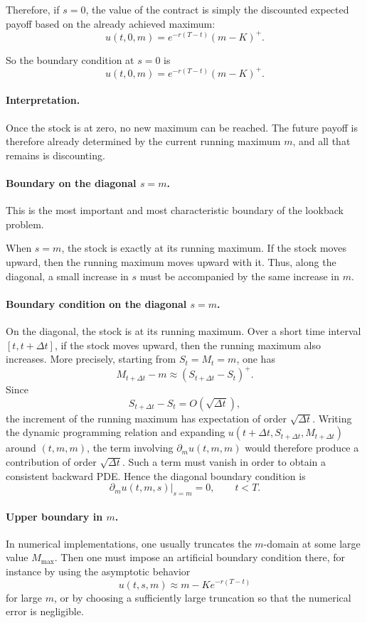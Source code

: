 \documentclass[11pt]{article}
\theoremstyle{plain}
\theoremstyle{definition}
\theoremstyle{remark}
\begin{document}
Therefore, if \(s=0\), the value of the contract is simply the discounted
expected payoff based on the already achieved maximum:
\[
u(t,0,m)=e^{-r(T-t)}(m-K)^+.
\]

So the boundary condition at \(s=0\) is
\[
\boxed{
u(t,0,m)=e^{-r(T-t)}(m-K)^+.
}
\]

\paragraph{Interpretation.}
Once the stock is at zero, no new maximum can be reached.
The future payoff is therefore already determined by the current running
maximum \(m\), and all that remains is discounting.

\paragraph{Boundary on the diagonal \(s=m\).}
This is the most important and most characteristic boundary of the
lookback problem.

When \(s=m\), the stock is exactly at its running maximum.
If the stock moves upward, then the running maximum moves upward with
it.
Thus, along the diagonal, a small increase in \(s\) must be accompanied
by the same increase in \(m\).
\paragraph{Boundary condition on the diagonal \(s=m\).}
On the diagonal, the stock is at its running maximum. Over a short time
interval \([t,t+\Delta t]\), if the stock moves upward, then the running
maximum also increases. More precisely, starting from \(S_t=M_t=m\), one
has
\[
M_{t+\Delta t}-m \approx (S_{t+\Delta t}-S_t)^+.
\]
Since
\[
S_{t+\Delta t}-S_t = O(\sqrt{\Delta t}),
\]
the increment of the running maximum has expectation of order
\(\sqrt{\Delta t}\). Writing the dynamic programming relation and
expanding \(u(t+\Delta t,S_{t+\Delta t},M_{t+\Delta t})\) around
\((t,m,m)\), the term involving \(\partial_m u(t,m,m)\) would therefore
produce a contribution of order \(\sqrt{\Delta t}\). Such a term must
vanish in order to obtain a consistent backward PDE. Hence the diagonal
boundary condition is
\[
\boxed{
\partial_m u(t,m,s)\vert_{s = m} = 0,
\qquad t<T.
}
\]

\paragraph{Upper boundary in \(m\).}
In numerical implementations, one usually truncates the \(m\)-domain at
some large value \(M_{\max}\).
Then one must impose an artificial boundary condition there, for
instance by using the asymptotic behavior
\[
u(t,s,m)\approx m-Ke^{-r(T-t)}
\]
for large \(m\), or by choosing a sufficiently large truncation so that
the numerical error is negligible.
\end{document}
